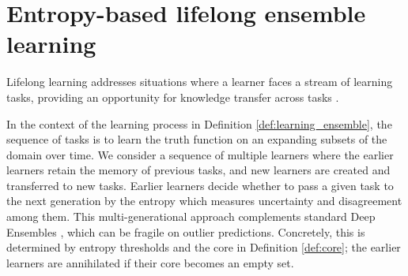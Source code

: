 \documentclass{article}
\theoremstyle{plain}
\theoremstyle{definition}
\theoremstyle{remark}
\begin{document}




\section{Entropy-based lifelong ensemble learning}

Lifelong learning addresses situations where a learner faces a stream of learning tasks, providing an opportunity for knowledge transfer across tasks \cite{Thrun1998, overcoming_forgetting, memory_based_lifelong, lifelong_review}.

In the context of the learning process in Definition \ref{def:learning_ensemble}, the sequence of tasks is to learn the truth function on an expanding subsets of the domain over time. We consider a sequence of multiple learners where the earlier learners retain the memory of previous tasks, and new learners are created and transferred to new tasks. Earlier learners decide whether to pass a given task to the next generation by the entropy which measures uncertainty and disagreement among them. This multi-generational approach complements standard Deep Ensembles \cite{DeepEnsembles, Ovadia2019}, which can be fragile on outlier predictions. Concretely, this is determined by entropy thresholds and the core in Definition \ref{def:core}; the earlier learners are annihilated if their core becomes an empty set.
\end{document}
